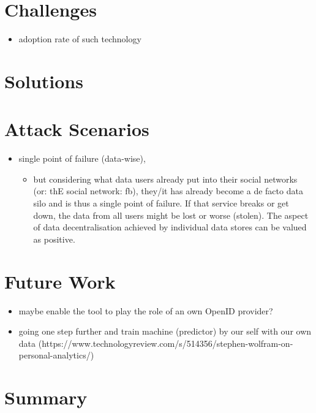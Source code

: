 \documentclass[12pt,english,a4paper,titlepage,cleardoublepage=empty,dottedtoc]{report}
\providecommand{\tightlist}{%
  \setlength{\itemsep}{0pt}\setlength{\parskip}{0pt}}
\begin{document}
\section{Challenges}\label{challenges}

\begin{itemize}
\tightlist
\item
  adoption rate of such technology
\end{itemize}

\section{Solutions}\label{solutions}

\section{Attack Scenarios}\label{attack-scenarios}

\begin{itemize}
\tightlist
\item
  single point of failure (data-wise),

  \begin{itemize}
  \tightlist
  \item
    but considering what data users already put into their social
    networks (or: thE social network: fb), they/it has already become a
    de facto data silo and is thus a single point of failure. If that
    service breaks or get down, the data from all users might be lost or
    worse (stolen). The aspect of data decentralisation achieved by
    individual data stores can be valued as positive.
  \end{itemize}
\end{itemize}

\section{Future Work}\label{future-work}

\begin{itemize}
\tightlist
\item
  maybe enable the tool to play the role of an own OpenID provider?
\item
  going one step further and train machine (predictor) by our self with
  our own data
  (https://www.technologyreview.com/s/514356/stephen-wolfram-on-personal-analytics/)
\end{itemize}

\section{Summary}\label{summary}
\end{document}
